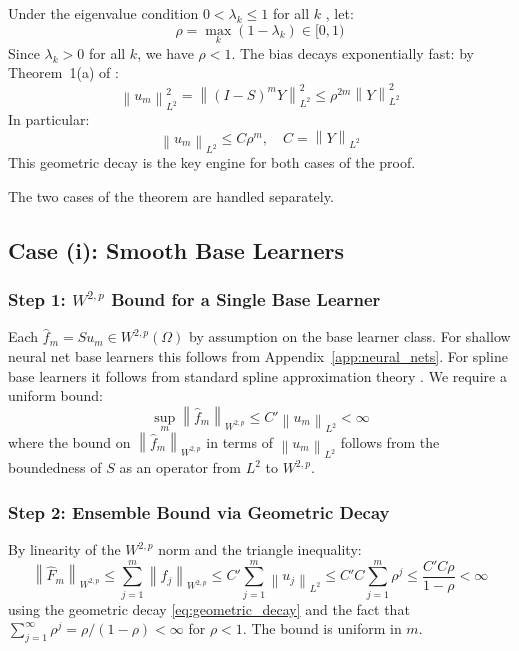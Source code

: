 \documentclass[12pt]{article}
\newcommand{\norm}[1]{\left\| #1 \right\|}
\newcommand{\Wtwop}{W^{2,p}(\Omega)}
\begin{document}
	Under the eigenvalue condition $0 < \lambda_k \leq 1$ for all $k$
	\citep[Theorem~1]{buhlmann2003boosting}, let:
	\begin{equation}
		\rho = \max_k (1-\lambda_k) \in [0,1)
	\end{equation}
	Since $\lambda_k > 0$ for all $k$, we have $\rho < 1$. The bias decays
	exponentially fast: by Theorem~1(a) of \citet{buhlmann2003boosting}:
	\begin{equation}
		\norm{u_m}_{L^2}^2 = \norm{(I-S)^m Y}_{L^2}^2
		\leq \rho^{2m} \norm{Y}_{L^2}^2
	\end{equation}
	In particular:
	\begin{equation}
		\norm{u_m}_{L^2} \leq C\rho^m, \quad C = \norm{Y}_{L^2}
		\label{eq:geometric_decay}
	\end{equation}
	This geometric decay is the key engine for both cases of the proof.
	
	The two cases of the theorem are handled separately.
	
	\subsection{Case (i): Smooth Base Learners}
	
	\subsubsection*{Step 1: $W^{2,p}$ Bound for a Single Base Learner}
	
	Each $\hat{f}_m = Su_m \in \Wtwop$ by assumption on the base learner class. For
	shallow neural net base learners this follows from Appendix~\ref{app:neural_nets}.
	For spline base learners it follows from standard spline approximation theory
	\citep{wahba1990splines}. We require a uniform bound:
	\begin{equation}
		\sup_m \norm{\hat{f}_m}_{W^{2,p}} \leq C' \norm{u_m}_{L^2} < \infty
	\end{equation}
	where the bound on $\norm{\hat{f}_m}_{W^{2,p}}$ in terms of $\norm{u_m}_{L^2}$
	follows from the boundedness of $S$ as an operator from $L^2$ to $W^{2,p}$.
	
	\subsubsection*{Step 2: Ensemble Bound via Geometric Decay}
	
	By linearity of the $W^{2,p}$ norm and the triangle inequality:
	\begin{equation}
		\norm{\hat{F}_m}_{W^{2,p}}
		\leq \sum_{j=1}^m \norm{\hat{f}_j}_{W^{2,p}}
		\leq C' \sum_{j=1}^m \norm{u_j}_{L^2}
		\leq C'C \sum_{j=1}^m \rho^j
		\leq \frac{C'C\rho}{1-\rho}
		< \infty
	\end{equation}
	using the geometric decay \eqref{eq:geometric_decay} and the fact that
	$\sum_{j=1}^\infty \rho^j = \rho/(1-\rho) < \infty$ for $\rho < 1$. The bound is
	uniform in $m$.
	
\end{document}
